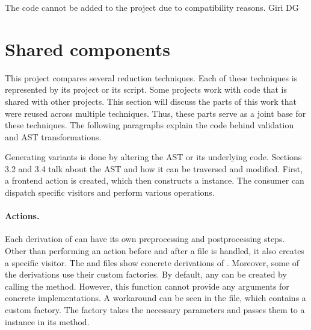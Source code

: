The code cannot be added to the project due to compatibility reasons.
Giri
DG

\section{Shared components}

This project compares several reduction techniques.
Each of these techniques is represented by its project or its script.
Some projects work with code that is shared with other projects.
This section will discuss the parts of this work that were reused across 
multiple techniques.
Thus, these parts serve as a joint base for these techniques.
The following paragraphs explain the code behind validation and AST 
transformations.

Generating variants is done by altering the AST or its underlying code.
Sections 3.2 and 3.4 talk about the AST and how it can be traversed and 
modified.
First, a frontend action is created, which then constructs a  
instance.
The consumer can dispatch specific visitors and perform various operations.

\paragraph{Actions.} Each derivation of  can have 
its own preprocessing and postprocessing steps.
Other than performing an action before and after a file is handled, it also 
creates a specific visitor.
The  and  files show concrete derivations 
of .
Moreover, some of the derivations use their custom factories.
By default, any  can be created by calling 
the  method.
However, this function cannot provide any arguments for concrete 
 implementations.
A workaround can be seen in the  file, which contains 
a custom factory.
The factory takes the necessary parameters and passes them to 
a  instance in its  method.

